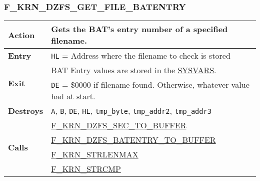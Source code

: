     \subsubsection{F\_KRN\_DZFS\_GET\_FILE\_BATENTRY}
    \label{func:fkrndzfsgetfilebatentry}
    \begin{tabular}{l p{15cm}}
        \hline\textbf{Action}
        & Gets the BAT's entry number of a specified filename.\\
        \hline\textbf{Entry} & \texttt{HL} = Address where the filename to 
        check is stored\\
        \hline\multirow[t]{2}{4em}{\textbf{Exit}}
        & BAT Entry values are stored in the \hyperref[sec:ram_memmap]{SYSVARS}.\\
        & \texttt{DE} = \$0000 if filename found. Otherwise, whatever value
        had at start.\\
        \hline\textbf{Destroys} & \texttt{A}, \texttt{B}, \texttt{DE}, \texttt{HL},
        \texttt{tmp\_byte}, \texttt{tmp\_addr2}, \texttt{tmp\_addr3} \\
        \hline\multirow[t]{4}{4em}{\textbf{Calls}}
        & \hyperref[func:fkrndzfssectobuffer]{F\_KRN\_DZFS\_SEC\_TO\_BUFFER}\\
        & \hyperref[func:fkrndzfsbatentrytobuffer]{F\_KRN\_DZFS\_BATENTRY\_TO\_BUFFER}\\
        & \hyperref[func:fkrnstrlenmax]{F\_KRN\_STRLENMAX}\\
        & \hyperref[func:fkrnstrcmp]{F\_KRN\_STRCMP}\\
        \hline
    \end{tabular}

